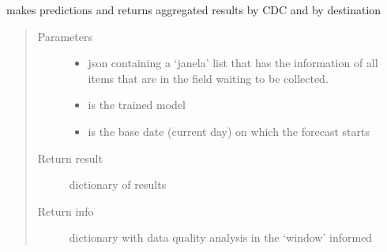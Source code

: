 \documentclass[letterpaper,10pt,english]{sphinxmanual}
\begin{document}
\begin{fulllineitems}
\label{\detokenize{algorithms:algorithms.cdc.cdc_predictor.predict}}
\sphinxAtStartPar
makes predictions and returns aggregated results by CDC and by destination
\begin{quote}\begin{description}
\item[{Parameters}] \leavevmode\begin{itemize}
\item {} 
\sphinxAtStartPar
{} \textendash{} json containing a ‘janela’ list that has the information of all items that are in the field waiting to be collected.

\item {} 
\sphinxAtStartPar
{} \textendash{} is the trained model

\item {} 
\sphinxAtStartPar
{} \textendash{} is the base date (current day) on which the forecast starts

\end{itemize}

\item[{Return result}] \leavevmode
\sphinxAtStartPar
dictionary of results

\item[{Return info}] \leavevmode
\sphinxAtStartPar
dictionary with data quality analysis in the ‘window’ informed

\end{description}\end{quote}

\end{fulllineitems}


\sphinxAtStartPar
{}

\begin{fulllineitems}
\label{\detokenize{algorithms:algorithms.cdc.delivery.Delivery}}
\end{fulllineitems}
\end{document}
